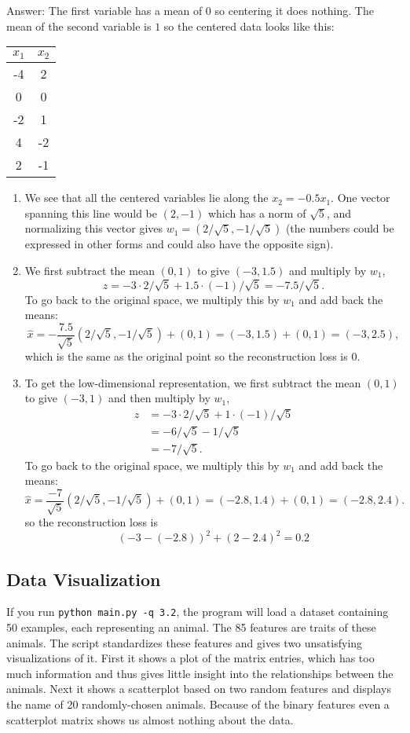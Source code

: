 \documentclass{article}
\def\ans#1{\par\gre{Answer: #1}}
\def\answer#1{\ans{#1}}
\def\gre#1{{\color{gre}#1}}
\def\enum#1{\begin{enumerate}#1\end{enumerate}}
\begin{document}
\answer{
The first variable has a mean of 0 so centering it does nothing. The mean of the second variable is $1$ so the centered data looks like this:
\begin{center}
\begin{tabular}{cc}
$x_1$ & $x_2$\\
\hline
-4 & 2\\
0 & 0\\
-2 & 1\\
4 & -2\\
2 & -1\\
\end{tabular}
\end{center}
\enum{
\item We see that all the centered variables lie along the $x_2 = -0.5x_1$. One vector spanning this line would be $(2,-1)$ which has a norm of $\sqrt{5}$, and normalizing this vector gives $w_1 = (2/\sqrt{5},-1/\sqrt{5})$ (the numbers could be expressed in other forms and could also have the opposite sign). 
\item We first subtract the mean $(0,1)$ to give $(-3,1.5)$ and multiply by $w_1$,
\[
z = -3\cdot2/\sqrt{5} + 1.5\cdot(-1)/\sqrt{5} = -7.5/\sqrt{5}.
\]
To go back to the original space, we multiply this by $w_1$ and add back the means:
\[
\hat{x} = -\frac{7.5}{\sqrt{5}}(2/\sqrt{5},-1/\sqrt{5}) + (0,1) = (-3,1.5) + (0,1) = (-3,2.5),
\]
which is the same as the original point so the reconstruction loss is 0.
\item To get the low-dimensional representation, we first subtract the mean $(0,1)$ to give $(-3,1)$ and then multiply by $w_1$,
\begin{align*}
z & = -3\cdot 2/\sqrt{5} + 1\cdot (-1)/\sqrt{5}\\
& = -6/\sqrt{5} -1/\sqrt{5}\\
& = -7/\sqrt{5}.
\end{align*}
To go back to the original space, we multiply this by $w_1$ and add back the means:
\[
\hat{x} = \frac{-7}{\sqrt{5}}(2/\sqrt{5},-1/\sqrt{5}) + (0,1) = (-2.8,1.4) + (0,1) = (-2.8,2.4).
\]
so the reconstruction loss is
\[
(-3-(-2.8))^2 + (2-2.4)^2 = 0.2
\]
}
}

\subsection{Data Visualization}

If you run \verb|python main.py -q 3.2|, the program will load a dataset containing 50 examples, each representing an animal. The 85 features are traits of these animals. The script standardizes these features and gives two unsatisfying visualizations of it. First it shows a plot of the matrix entries, which has too much information and thus gives little insight into the relationships between the animals. Next it shows a scatterplot based on two random features and displays the name of 20 randomly-chosen animals. Because of the binary features even a scatterplot matrix shows us almost nothing about the data.
\end{document}
